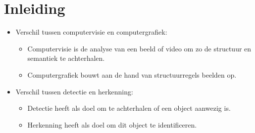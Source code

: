 \chapter{Inleiding}
\begin{itemize}
	\item Verschil tussen computervisie en computergrafiek:
	\begin{itemize}
		\item Computervisie is de analyse van een beeld of video om zo de structuur en semantiek te achterhalen. 
		\item Computergrafiek bouwt aan de hand van structuurregels beelden op.
	\end{itemize} 
	\item Verschil tussen detectie en herkenning:
	\begin{itemize}
		\item Detectie heeft als doel om te achterhalen of een object aanwezig is.
		\item Herkenning heeft als doel om dit object te identificeren.
	\end{itemize}
\end{itemize}